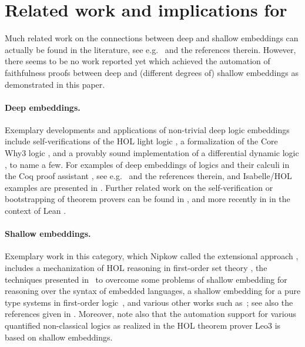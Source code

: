 \section{Related work and implications for \logikey}
\label{sec:logikey}

Much related work on the connections between deep and shallow embeddings can actually be found in the literature, see e.g.~\cite{SvenningssonA12,KaposiKK19,PrinzKL22,WangCT24} and the references therein. However, there seems to be no work reported yet which achieved the automation of faithfulness proofs between deep and (different degrees of) shallow embeddings as demonstrated in this paper. 



\paragraph{Deep embeddings.}
Exemplary developments and applications of non-trivial deep logic embeddings include self-verifications of the HOL light logic \cite{Harrison06,AbrahamssonMKS22}, a formalization of the Core Why3 logic \cite{10.1145/3632902}, and a provably sound implementation of a differential dynamic logic \cite{deep2017}, to name a few. For examples of deep embeddings of logics and their calculi in the Coq proof assistant \cite{Coq}, see e.g.~\cite{SozeauABCFKMTW20} and the references therein, and Isabelle/HOL examples are presented in \cite{BlanchettePT17,FOL_Seq_Calc3-AFP,Implicational_Logic-AFP,LIPIcs.ITP.2022.13}. Further related work on the self-verification or bootstrapping of theorem provers 
can be found in \cite{Carneiro20}, and more recently in \cite{carneiro2024lean4leanverifiedtypecheckerlean} in the context of Lean \cite{Lean}.

\paragraph{Shallow embeddings.}
Exemplary work in this category, which Nipkow called the extensional approach \cite{Nipkow2002}, includes a mechanization of HOL reasoning in first-order set theory \cite{GuilloudGGK24}, the techniques presented in~\cite{KaposiKK19} to overcome some problems of shallow embedding for reasoning over the syntax of embedded languages, a shallow embedding for a pure type systems in first-order logic~\cite{LIPIcs.TYPES.2016.9}, and various other works such as~\cite{RabeLP14,LammichM12}; see also the references given in \cite{WangCT24}.
Moreover, note also that the automation support for various quantified non-classical logics as realized in the HOL theorem prover Leo3 \cite{J51,J72} is based on shallow embeddings. 


